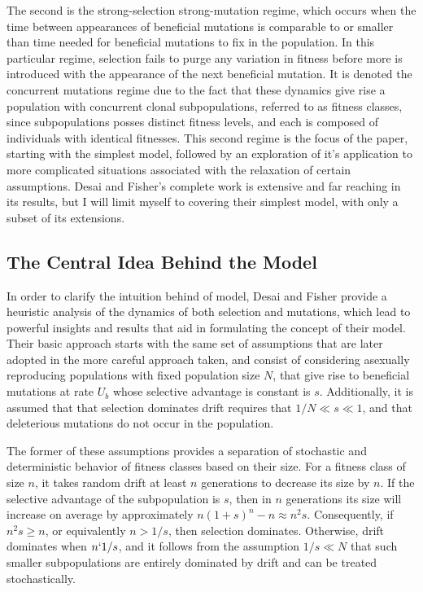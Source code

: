 \documentclass[12pt]{article}
\begin{document}
The second is the strong-selection strong-mutation regime, which occurs when the time between appearances of beneficial mutations is comparable to or smaller than time needed for beneficial mutations to fix in the population.  In this particular regime, selection fails to purge any variation in fitness before more is introduced with the appearance of the next beneficial mutation.  It is denoted the concurrent mutations regime due to the fact that these dynamics give rise a population with concurrent clonal subpopulations, referred to as fitness classes, since subpopulations posses distinct fitness levels, and each is composed of individuals with identical fitnesses.  This second regime is the focus of the paper, starting with the simplest model, followed by an exploration of it's application to more complicated situations associated with the relaxation of certain assumptions.  Desai and Fisher's complete work is extensive and far reaching in its results, but I will limit myself to covering their simplest model, with only a subset of its extensions. 

\subsection*{The Central Idea Behind the Model}
In order to clarify the intuition behind of model, Desai and Fisher provide a heuristic analysis of the dynamics of both selection and mutations, which lead to powerful insights and results that aid in formulating the concept of their model.  Their basic approach starts with the same set of assumptions that are later adopted in the more careful approach taken, and consist of considering asexually reproducing populations with fixed population size $N$, that give rise to beneficial mutations at rate $U_b$ whose selective advantage is constant is $s$.  Additionally, it is assumed that that selection dominates drift requires that $1/N \ll s \ll 1$, and that deleterious mutations do not occur in the population. 

The former of these assumptions provides a separation of stochastic and deterministic behavior of fitness classes based on their size.  For a fitness class of size $n$, it takes random drift at least $n$ generations to decrease its size by $n$.  If the selective advantage of the subpopulation is $s$, then in $n$ generations its size will increase on average by approximately $n(1+s)^n-n \approx n^2s$.  Consequently, if $n^2s \ge n$, or equivalently $n>1/s$, then selection dominates.  Otherwise, drift dominates when $n\lq 1/s$, and it follows from the assumption $1/s \ll N$ that such smaller subpopulations are entirely dominated by drift and can be treated stochastically.
\end{document}
